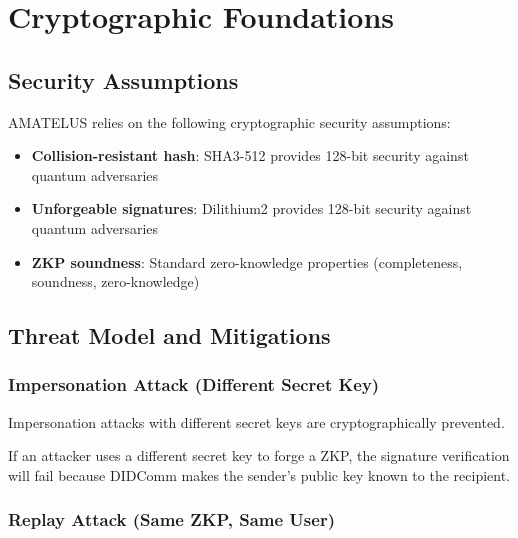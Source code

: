 \chapter{Cryptographic Foundations}

\section{Security Assumptions}

\begin{definition}
  \label{def:crypto-assumptions}
  AMATELUS relies on the following cryptographic security assumptions:
  \begin{itemize}
    \item \textbf{Collision-resistant hash}: SHA3-512 provides 128-bit security against quantum adversaries
    \item \textbf{Unforgeable signatures}: Dilithium2 provides 128-bit security against quantum adversaries
    \item \textbf{ZKP soundness}: Standard zero-knowledge properties (completeness, soundness, zero-knowledge)
  \end{itemize}
  \leanok
\end{definition}

\section{Threat Model and Mitigations}

\subsection{Impersonation Attack (Different Secret Key)}

\begin{theorem}
  \label{thm:impersonation-resistance}
  Impersonation attacks with different secret keys are cryptographically prevented.

  If an attacker uses a different secret key to forge a ZKP, the signature verification will fail
  because DIDComm makes the sender's public key known to the recipient.
  \leanok
\end{theorem}

\subsection{Replay Attack (Same ZKP, Same User)}

